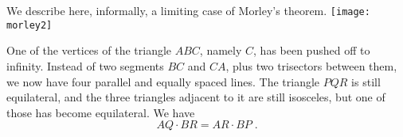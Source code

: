 \documentclass[12pt]{article}
\begin{document}
We describe here, informally, a limiting case of Morley's theorem.
\texttt{[image: morley2]}

One of the vertices of the triangle $ABC$, namely $C$, has been pushed
off to infinity. Instead of two segments $BC$ and $CA$, plus
two trisectors between them, we now have four parallel and equally
spaced lines. The triangle $PQR$ is still equilateral, and the three
triangles adjacent to it are still isosceles, but one of those has become
equilateral. We have
$$AQ\cdot BR = AR\cdot BP\;.$$
\end{document}
